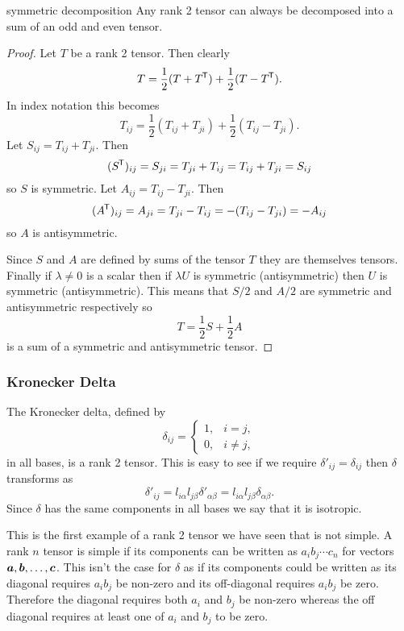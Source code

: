 \begin{lemma}{symmetric decomposition}{}
    Any rank 2 tensor can always be decomposed into a sum of an odd and even tensor.
\end{lemma}
\begin{proof}
    Let \(T\) be a rank 2 tensor.
    Then clearly
    \[T = \frac{1}{2}(T + T^{\mkern-1.5mu\mathsf{T}}) + \frac{1}{2}(T - T^{\mkern-1.5mu\mathsf{T}}).\]
    In index notation this becomes
    \[T_{ij} = \frac{1}{2}(T_{ij} + T_{ji}) + \frac{1}{2}(T_{ij} - T_{ji}).\]
    Let \(S_{ij} = T_{ij} + T_{ji}\).
    Then
    \[(S^{\mkern-1.5mu\mathsf{T}})_{ij} = S_{ji} = T_{ji} + T_{ij} = T_{ij} + T_{ji} = S_{ij}\]
    so \(S\) is symmetric.
    Let \(A_{ij} = T_{ij} - T_{ji}\).
    Then
    \[(A^{\mkern-1.5mu\mathsf{T}})_{ij} = A_{ji} = T_{ji} - T_{ij} = -(T_{ij} - T_{ji}) = -A_{ij}\]
    so \(A\) is antisymmetric.
    
    Since \(S\) and \(A\) are defined by sums of the tensor \(T\) they are themselves tensors.
    Finally if \(\lambda\ne 0\) is a scalar then if \(\lambda U\) is  symmetric (antisymmetric) then \(U\) is symmetric (antisymmetric).
    This means that \(S/2\) and \(A/2\) are symmetric and antisymmetric respectively so
    \[T = \frac{1}{2}S + \frac{1}{2}A\]
    is a sum of a symmetric and antisymmetric tensor.
\end{proof}

\subsubsection{Kronecker Delta}
The Kronecker delta, defined by
\[
\delta_{ij} =
\begin{cases}
    1, & i = j,\\
    0, & i \ne j,
\end{cases}
\]
in all bases, is a rank 2 tensor.
This is easy to see if we require \(\delta'_{ij} = \delta_{ij}\) then \(\delta\) transforms as
\[\delta'_{ij} = l_{i\alpha}l_{j\beta}\delta'_{\alpha\beta} = l_{i\alpha}l_{j\beta}\delta_{\alpha\beta}.\]
Since \(\delta\) has the same components in all bases we say that it is isotropic.

This is the first example of a rank 2 tensor we have seen that is not simple.
A rank \(n\) tensor is simple if its components can be written as \(a_ib_j\dotsm c_n\) for vectors \(\bm{a}, \bm{b}, \dotsc, \bm{c}\).
This isn't the case for \(\delta\) as if its components could be written as \(\)its diagonal requires \(a_ib_j\) be non-zero and its off-diagonal requires \(a_ib_j\) be zero.
Therefore the diagonal requires both \(a_i\) and \(b_j\) be non-zero whereas the off diagonal requires at least one of \(a_i\) and \(b_j\) to be zero.

